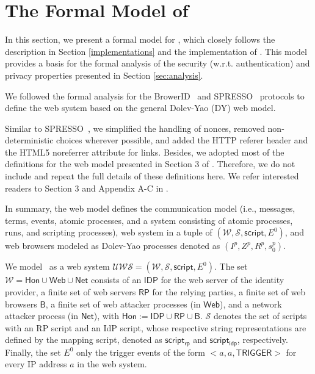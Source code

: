 \appendix

\newc
\section{The Formal Model of \usso}
\label{appendix-model}

In this section, we present a formal model for \usso, which closely follows the description in Section \ref{implementations} and the implementation of \usso.
This model provides a basis for the formal analysis of the security (w.r.t. authentication) and privacy properties presented in Section \ref{sec:analysis}.

\vspace{1mm}  We followed the formal analysis for the BrowerID~\cite{BrowserID} and SPRESSO~\cite{SPRESSO} protocols to define the web system based on the general Dolev-Yao (DY) web model. 

Similar to SPRESSO~\cite{SPRESSO}, we simplified the handling of nonces, removed non-deterministic choices wherever possible, and added the HTTP referer header and the HTML5 noreferrer attribute for links.
Besides, we adopted most of the definitions for the web model presented in Section 3 of \cite{SPRESSO}. Therefore, we do not include and repeat the full details of these definitions here. We refer interested readers to Section 3 and Appendix A-C in \cite{SPRESSO}.

In summary, the web model defines the communication model (i.e., messages, terms, events, atomic processes, and a system consisting of atomic processes, runs, and scripting processes), web system in a tuple of $(\mathcal{W}, \mathcal{S}, \mathsf{script}, E^0)$, and web browsers modeled as Dolev-Yao processes denoted as $(I^p, Z^p, R^p, s_0^p)$. 

\vspace{1mm}  We model \usso\ as a web system $\mathcal{U\!W\!S}=(\mathcal{W}, \mathcal{S}, \mathsf{script}, E^0)$. The set $\mathcal{W} = \mathsf{Hon} \cup \mathsf{Web} \cup \mathsf{Net}$ consists of an $\mathsf{IDP}$ for the web server of the identity provider, a finite set of web servers $\mathsf{RP}$ for the relying parties, 
a finite set of web browsers $\mathsf{B}$, %
a finite set of web attacker processes (in $\mathsf{Web}$), and a network attacker process (in $\mathsf{Net}$), with $\mathsf{Hon}:=\mathsf{IDP}\cup\mathsf{RP}\cup\mathsf{B}$. $\mathcal{S}$ denotes the set of scripts with an RP script and an IdP script, whose respective string representations are defined by the mapping script, denoted as $\mathsf{script_{rp}}$ and $\mathsf{script_{idp}}$, respectively. Finally, the set $E^0$ only the trigger events of the form $<a, a, \mathsf{TRIGGER}>$ for every IP address $a$ in the web system.

